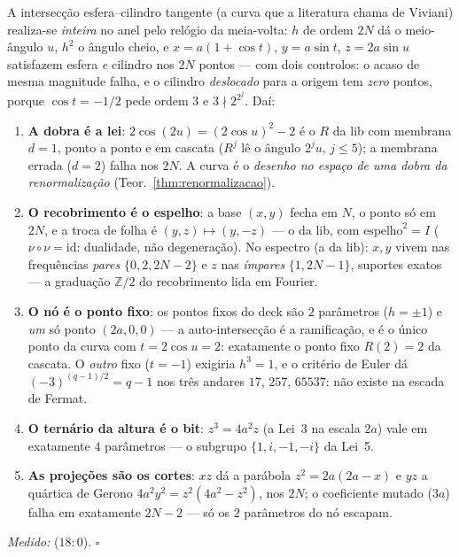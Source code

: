 \documentclass[livro.tex]{subfiles}
\begin{document}
\begin{teorema}\label{thm:viviani}
A intersec\c{c}\~ao esfera--cilindro tangente (a curva que a literatura
chama de Viviani) realiza-se \emph{inteira} no anel pelo rel\'ogio da
meia-volta: $h$ de ordem $2N$ d\'a o meio-\^angulo $u$, $h^{2}$ o
\^angulo cheio, e $x=a(1+\cos t)$, $y=a\sin t$, $z=2a\sin u$
satisfazem esfera \emph{e} cilindro nos $2N$ pontos --- com dois
controlos: o acaso de mesma magnitude falha, e o cilindro
\emph{deslocado} para a origem tem \emph{zero} pontos, porque
$\cos t=-1/2$ pede ordem $3$ e $3\nmid2^{2^{j}}$. Da\'i:
\begin{enumerate}
\item \textbf{A dobra \'e a lei}: $2\cos(2u)=(2\cos u)^{2}-2$ \'e
o $R$ da lib com membrana $d=1$, ponto a ponto e em cascata
($R^{j}$ l\^e o \^angulo $2^{j}u$, $j\le5$); a membrana errada
($d=2$) falha nos $2N$. A curva \'e o \emph{desenho no espa\c{c}o de
uma dobra da renormaliza\c{c}\~ao} (Teor.~\ref{thm:renormalizacao}).
\item \textbf{O recobrimento \'e o espelho}: a base $(x,y)$ fecha em
$N$, o ponto s\'o em $2N$, e a troca de folha \'e
$(y,z)\mapsto(y,-z)$ --- o  da lib, com
$\mathrm{espelho}^{2}=I$ ($\nu\circ\nu=\mathrm{id}$: dualidade, n\~ao
degenera\c{c}\~ao). No espectro (a  da lib): $x,y$ vivem nas
frequ\^encias \emph{pares} $\{0,2,2N{-}2\}$ e $z$ nas \emph{\'impares}
$\{1,2N{-}1\}$, suportes exatos --- a gradua\c{c}\~ao $\mathbb{Z}/2$ do
recobrimento lida em Fourier.
\item \textbf{O n\'o \'e o ponto fixo}: os pontos fixos do deck s\~ao
$2$ par\^ametros ($h=\pm1$) e \emph{um} s\'o ponto $(2a,0,0)$ --- a
auto-intersec\c{c}\~ao \'e a ramifica\c{c}\~ao, e \'e o \'unico ponto
da curva com $t=2\cos u=2$: exatamente o ponto fixo $R(2)=2$ da
cascata. O \emph{outro} fixo ($t=-1$) exigiria $h^{3}=1$, e o crit\'erio
de Euler d\'a $(-3)^{(q-1)/2}=q-1$ nos tr\^es andares $17$, $257$,
$65537$: n\~ao existe na escada de Fermat.
\item \textbf{O ternário da altura \'e o bit}: $z^{3}=4a^{2}z$ (a Lei~3
na escala $2a$) vale em exatamente $4$ par\^ametros --- o subgrupo
$\{1,i,-1,-i\}$ da Lei~5.
\item \textbf{As proje\c{c}\~oes s\~ao os cortes}: $xz$ d\'a a
par\'abola $z^{2}=2a(2a-x)$ e $yz$ a qu\'artica de Gerono
$4a^{2}y^{2}=z^{2}(4a^{2}-z^{2})$, nos $2N$; o coeficiente mutado
($3a$) falha em exatamente $2N-2$ --- s\'o os $2$ par\^ametros do n\'o
escapam.
\end{enumerate}
\emph{Medido:}  ($18{:}0$).
$\square$
\end{teorema}
\end{document}

